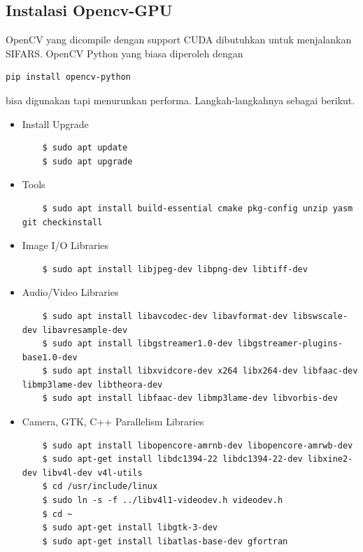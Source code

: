 \subsection{Instalasi Opencv-GPU}
OpenCV yang dicompile dengan support CUDA dibutuhkan untuk menjalankan SIFARS.
OpenCV Python yang biasa diperoleh dengan 
\begin{lstlisting}
pip install opencv-python 
\end{lstlisting} bisa digunakan tapi menurunkan performa. Langkah-langkahnya sebagai berikut.

\begin{itemize}
  \item Install Upgrade
  
  \begin{lstlisting}
    $ sudo apt update
    $ sudo apt upgrade
  \end{lstlisting}

  \item Tools
  
  \begin{lstlisting}
    $ sudo apt install build-essential cmake pkg-config unzip yasm git checkinstall
  \end{lstlisting}
  
  \item Image I/O Libraries
  
  \begin{lstlisting}
    $ sudo apt install libjpeg-dev libpng-dev libtiff-dev
  \end{lstlisting}

  \item Audio/Video Libraries
  
  \begin{lstlisting}
    $ sudo apt install libavcodec-dev libavformat-dev libswscale-dev libavresample-dev
    $ sudo apt install libgstreamer1.0-dev libgstreamer-plugins-base1.0-dev
    $ sudo apt install libxvidcore-dev x264 libx264-dev libfaac-dev libmp3lame-dev libtheora-dev 
    $ sudo apt install libfaac-dev libmp3lame-dev libvorbis-dev
  \end{lstlisting}

  \item Camera, GTK, C++ Parallelism Libraries
  
  \begin{lstlisting}
    $ sudo apt install libopencore-amrnb-dev libopencore-amrwb-dev
    $ sudo apt-get install libdc1394-22 libdc1394-22-dev libxine2-dev libv4l-dev v4l-utils
    $ cd /usr/include/linux
    $ sudo ln -s -f ../libv4l1-videodev.h videodev.h
    $ cd ~
    $ sudo apt-get install libgtk-3-dev
    $ sudo apt-get install libatlas-base-dev gfortran
  \end{lstlisting}


\end{itemize}
